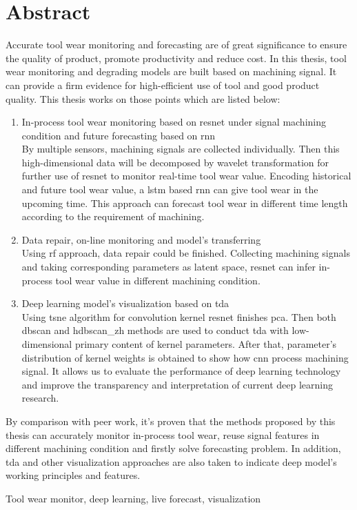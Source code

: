 \renewcommand{\baselinestretch}{1.5}
\fontsize{12pt}{13pt}\selectfont

\chapter[ABSTRACT]{Abstract}

Accurate tool wear monitoring and forecasting are of great significance to ensure the quality of product, promote productivity and reduce cost. In this thesis, tool wear monitoring and degrading models are built based on machining signal. It can provide a firm evidence for high-efficient use of tool and good product quality. This thesis works on those points which are listed below:

\begin{enumerate}
	\item In-process tool wear monitoring based on \gls{resnet} under signal machining condition and future forecasting based on \gls{rnn} \\
	By multiple sensors, machining signals are collected individually. Then this high-dimensional data will be decomposed by wavelet transformation for further use of \gls{resnet} to monitor real-time tool wear value. Encoding historical and future tool wear value, a \gls{lstm} based \gls{rnn} can give tool wear in the upcoming time. This approach can forecast tool wear in different time length according to the requirement of machining.
	\item Data repair, on-line monitoring and model's transferring\\
	Using \gls{rf} approach, data repair could be finished. Collecting machining signals and taking corresponding parameters as latent space, \gls{resnet} can infer in-process tool wear value in different machining condition.
	\item Deep learning model's visualization based on \gls{tda}\\
	Using \gls{tsne} algorithm for convolution kernel \gls{resnet} finishes \gls{pca}. Then both \gls{dbscan} and \gls{hdbscan_zh} methods are used to conduct \gls{tda} with low-dimensional primary content of kernel parameters. After that, parameter's distribution of kernel weights is obtained to show how \gls{cnn} process machining signal. It allows us to evaluate the performance of deep learning technology and improve the transparency and interpretation of current deep learning research.
\end{enumerate}

By comparison with peer work, it's proven that the methods proposed by this thesis can accurately monitor in-process tool wear, reuse signal features in different machining condition and firstly solve forecasting problem. In addition, \gls{tda} and other visualization approaches are also taken to indicate deep model's working principles and features.

 \quad Tool wear monitor, deep learning, live forecast, visualization

\clearpage
\endinput